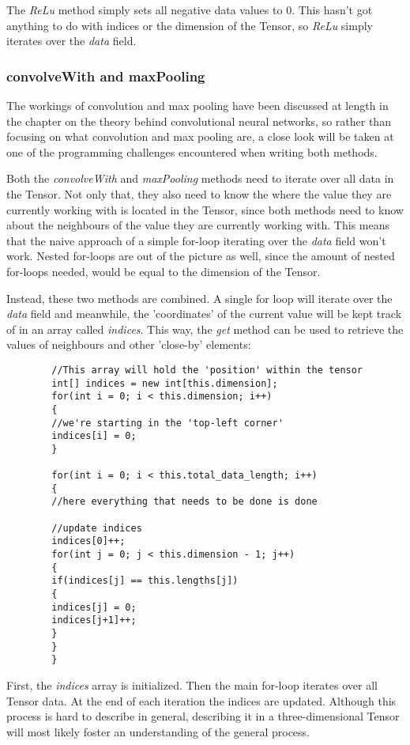 \documentclass[12pt, titlepage]{article}
\begin{document}
		The \textit{ReLu} method simply sets all negative data values to $0$. This hasn't got anything to do with indices or the dimension of the Tensor, so \textit{ReLu} simply iterates over the \textit{data} field.
		
		\subsubsection{convolveWith and maxPooling} \label{convolveWith}
		The workings of convolution and max pooling have been discussed at length in the chapter on the theory behind convolutional neural networks, so rather than focusing on what convolution and max pooling are, a close look will be taken at one of the programming challenges encountered when writing both methods.
		
		Both the \textit{convolveWith} and \textit{maxPooling} methods need to iterate over all data in the Tensor. Not only that, they also need to know the where the value they are currently working with is located in the Tensor, since both methods need to know about the neighbours of the value they are currently working with. This means that the naive approach of a simple for-loop iterating over the \textit{data} field won't work. Nested for-loops are out of the picture as well, since the amount of nested for-loops needed, would be equal to the dimension of the Tensor.
		
		Instead, these two methods are combined. A single for loop will iterate over the \textit{data} field and meanwhile, the 'coordinates' of the current value will be kept track of in an array called \textit{indices}. This way, the \textit{get} method can be used to retrieve the values of neighbours and other 'close-by' elements:
		\begin{lstlisting}
		//This array will hold the 'position' within the tensor
		int[] indices = new int[this.dimension];
		for(int i = 0; i < this.dimension; i++)
		{
		//we're starting in the 'top-left corner'
		indices[i] = 0;
		}
		
		for(int i = 0; i < this.total_data_length; i++)
		{
		//here everything that needs to be done is done 
		
		//update indices
		indices[0]++;
		for(int j = 0; j < this.dimension - 1; j++)
		{
		if(indices[j] == this.lengths[j])
		{
		indices[j] = 0;
		indices[j+1]++;
		}
		}
		}
		\end{lstlisting}
		First, the \textit{indices} array is initialized. Then the main for-loop iterates over all Tensor data. At the end of each iteration the indices are updated. Although this process is hard to describe in general, describing it in a three-dimensional Tensor will most likely foster an understanding of the general process.
		
\end{document}

